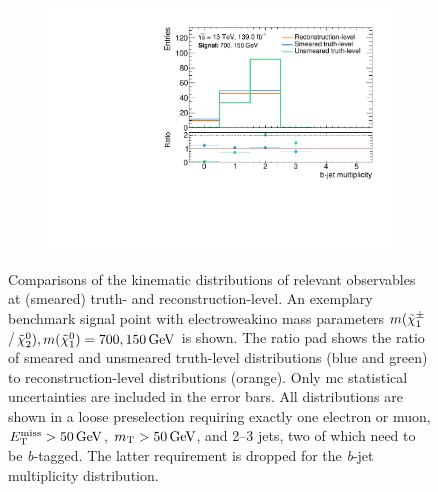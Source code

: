 \begin{figure}
\begin{subfigure}[b]{0.47\linewidth}
		\centering\includegraphics[width=\textwidth]{20210324/700_150/nBJet30_C1N2_Wh_hbb_700p0_150p0_smeared.pdf}
	\end{subfigure}\hfill
	\caption{Comparisons of the kinematic distributions of relevant observables at (smeared) truth- and reconstruction-level. An exemplary benchmark signal point with electroweakino mass parameters \mbox{$m(\tilde{\chi}_1^\pm$/$\neutr), m(\lsp) = 700, \SI{150}{\GeV}$} is shown. The ratio pad shows the ratio of smeared and unsmeared truth-level distributions (blue and green) to reconstruction-level distributions (orange). Only \gls{mc} statistical uncertainties are included in the error bars. All distributions are shown in a loose preselection requiring exactly one electron or muon, $\met>\SI{50}{\GeV}$, $\mt > \SI{50}{\GeV}$, and 2--3 jets, two of which need to be \textit{b}-tagged. The latter requirement is dropped for the \textit{b}-jet multiplicity distribution.}
	\label{fig:smearing_preselection}
\end{figure}
 
